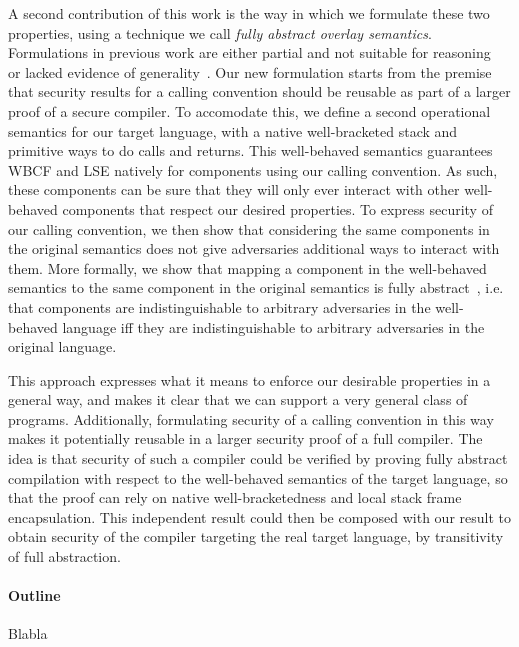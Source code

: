 \documentclass[acmsmall,review,anonymous]{acmart}\settopmatter{printfolios=true,printccs=false,printacmref=false}
\begin{document}
A second contribution of this work is the way in which we formulate these two properties, using a technique we call {\itshape fully abstract overlay semantics}.
Formulations in previous work are either partial and not suitable for reasoning~\cite{abadi_control-flow_2005} or lacked evidence of generality~\cite{skorstengaard_reasoning_2017}.
Our new formulation starts from the premise that security results for a calling convention should be reusable as part of a larger proof of a secure compiler.
To accomodate this, we define a second operational semantics for our target language, with a native well-bracketed stack and primitive ways to do calls and returns.
This well-behaved semantics guarantees WBCF and LSE natively for components using our calling convention.
As such, these components can be sure that they will only ever interact with other well-behaved components that respect our desired properties.
To express security of our calling convention, we then show that considering the same components in the original semantics does not give adversaries additional ways to interact with them. 
More formally, we show that mapping a component in the well-behaved semantics to the same component in the original semantics is fully abstract~\cite{abadi_protection_1999}, i.e. that components are indistinguishable to arbitrary adversaries in the well-behaved language iff they are indistinguishable to arbitrary adversaries in the original language.

This approach expresses what it means to enforce our desirable properties in a general way, and makes it clear that we can support a very general class of programs.
Additionally, formulating security of a calling convention in this way makes it potentially reusable in a larger security proof of a full compiler.
The idea is that security of such a compiler could be verified by proving fully abstract compilation with respect to the well-behaved semantics of the target language, so that the proof can rely on native well-bracketedness and local stack frame encapsulation.
This independent result could then be composed with our result to obtain security of the compiler targeting the real target language, by transitivity of full abstraction.


\paragraph{Outline} Blabla
\end{document}
